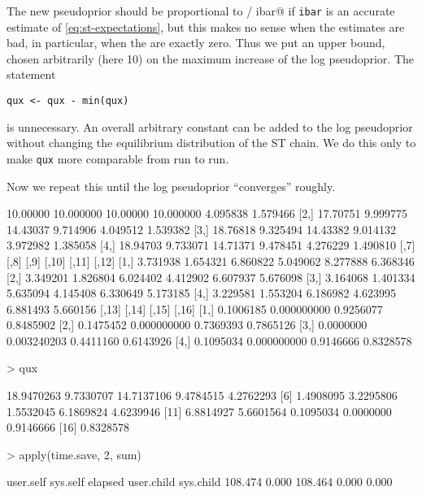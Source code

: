 \documentclass[11pt]{article}
\begin{document}
The new pseudoprior should be proportional to  / ibar@ if \texttt{ibar}
is an accurate estimate of \eqref{eq:st-expectations}, but this makes no sense
when the estimates are bad, in particular, when the are exactly zero.  Thus
we put an upper bound, chosen arbitrarily (here 10) on the maximum increase
of the log pseudoprior.  The statement
\begin{verbatim}
qux <- qux - min(qux)
\end{verbatim}
is unnecessary.  An overall arbitrary constant can be added to
the log pseudoprior without changing the equilibrium distribution of the
ST chain.
We do this only to make \texttt{qux} more comparable from
run to run.

Now we repeat this until the log pseudoprior ``converges'' roughly.
\begin{Schunk}
\begin{Soutput}
         [,1]      [,2]     [,3]      [,4]     [,5]     [,6]
[1,] 10.00000 10.000000 10.00000 10.000000 4.095838 1.579466
[2,] 17.70751  9.999775 14.43037  9.714906 4.049512 1.539382
[3,] 18.76818  9.325494 14.43382  9.014132 3.972982 1.385058
[4,] 18.94703  9.733071 14.71371  9.478451 4.276229 1.490810
         [,7]     [,8]     [,9]    [,10]    [,11]    [,12]
[1,] 3.731938 1.654321 6.860822 5.049062 8.277888 6.368346
[2,] 3.349201 1.826804 6.024402 4.412902 6.607937 5.676098
[3,] 3.164068 1.401334 5.635094 4.145408 6.330649 5.173185
[4,] 3.229581 1.553204 6.186982 4.623995 6.881493 5.660156
         [,13]       [,14]     [,15]     [,16]
[1,] 0.1006185 0.000000000 0.9256077 0.8485902
[2,] 0.1475452 0.000000000 0.7369393 0.7865126
[3,] 0.0000000 0.003240203 0.4411160 0.6143926
[4,] 0.1095034 0.000000000 0.9146666 0.8328578
\end{Soutput}
\begin{Sinput}
> qux
\end{Sinput}
\begin{Soutput}
 [1] 18.9470263  9.7330707 14.7137106  9.4784515  4.2762293
 [6]  1.4908095  3.2295806  1.5532045  6.1869824  4.6239946
[11]  6.8814927  5.6601564  0.1095034  0.0000000  0.9146666
[16]  0.8328578
\end{Soutput}
\begin{Sinput}
> apply(time.save, 2, sum)
\end{Sinput}
\begin{Soutput}
 user.self   sys.self    elapsed user.child  sys.child 
   108.474      0.000    108.464      0.000      0.000 
\end{Soutput}
\end{Schunk}
\end{document}

